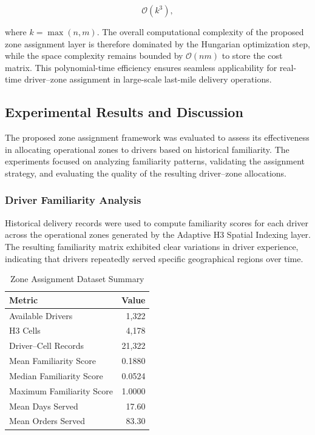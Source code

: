 \documentclass{article}
\begin{document}
\begin{equation}
\mathcal{O}(k^3),
\end{equation}

where $k = \max(n, m)$. The overall computational complexity of the proposed zone assignment layer is therefore dominated by the Hungarian optimization step, while the space complexity remains bounded by $\mathcal{O}(nm)$ to store the cost matrix. This polynomial-time efficiency ensures seamless applicability for real-time driver--zone assignment in large-scale last-mile delivery operations.

\subsection{Experimental Results and Discussion}
The proposed zone assignment framework was evaluated to assess its effectiveness in allocating operational zones to drivers based on historical familiarity. The experiments focused on analyzing familiarity patterns, validating the assignment strategy, and evaluating the quality of the resulting driver--zone allocations.

\subsubsection{Driver Familiarity Analysis}
Historical delivery records were used to compute familiarity scores for each driver across the operational zones generated by the Adaptive H3 Spatial Indexing layer. The resulting familiarity matrix exhibited clear variations in driver experience, indicating that drivers repeatedly served specific geographical regions over time.

\begin{table}[htbp]
\centering
\caption{Zone Assignment Dataset Summary}
\label{tab:zone_assignment_summary}
\begin{tabular}{lr}
\toprule
\textbf{Metric} & \textbf{Value} \\
\midrule
Available Drivers & 1,322 \\
H3 Cells & 4,178 \\
Driver--Cell Records & 21,322 \\
Mean Familiarity Score & 0.1880 \\
Median Familiarity Score & 0.0524 \\
Maximum Familiarity Score & 1.0000 \\
Mean Days Served & 17.60 \\
Mean Orders Served & 83.30 \\
\bottomrule
\end{tabular}
\end{table}
\end{document}
